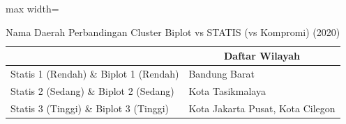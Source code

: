 \begin{table}[H]
\centering
\caption{Nama Daerah Perbandingan Cluster Biplot vs STATIS (vs Kompromi) (2020)} \label{tab:sample2biplot_statis_name_2020}
\begin{adjustbox}{max width=\textwidth}
\begin{tabular}{|>{\centering\arraybackslash}p{4cm}|p{10cm}|}
\hline
\multicolumn{1}{|c|}{\textbf{Kategori}} & \multicolumn{1}{c|}{\textbf{Daftar Wilayah}} \\
\hline
Statis 1 (Rendah) \& Biplot 1 (Rendah) & Bandung Barat \\
\hline
Statis 2 (Sedang) \& Biplot 2 (Sedang) & Kota Tasikmalaya \\
\hline
Statis 3 (Tinggi) \& Biplot 3 (Tinggi) & Kota Jakarta Pusat, Kota Cilegon \\
\hline
\end{tabular}
\end{adjustbox}
\end{table}